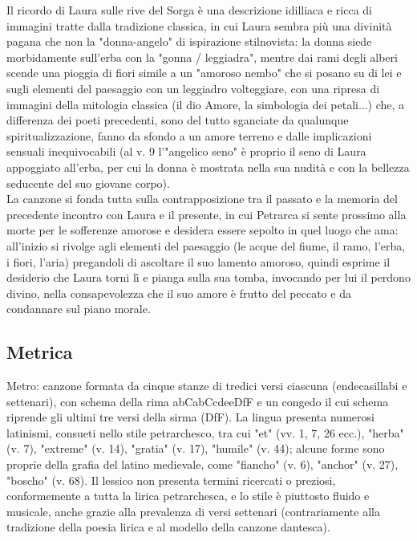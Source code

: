 \documentclass[10pt,a4paper]{article}
\begin{document}
Il ricordo di Laura sulle rive del Sorga è una descrizione idilliaca e ricca di immagini tratte dalla tradizione classica, in cui Laura sembra più una divinità pagana che non la "donna-angelo" di ispirazione stilnovista: la donna siede morbidamente sull'erba con la "gonna / leggiadra", mentre dai rami degli alberi scende una pioggia di fiori simile a un "amoroso nembo" che si posano su di lei e sugli elementi del paesaggio con un leggiadro volteggiare, con una ripresa di immagini della mitologia classica (il dio Amore, la simbologia dei petali...) che, a differenza dei poeti precedenti, sono del tutto sganciate da qualunque spiritualizzazione, fanno da sfondo a un amore terreno e dalle implicazioni sensuali inequivocabili (al v. 9 l'"angelico seno" è proprio il seno di Laura appoggiato all'erba, per cui la donna è mostrata nella sua nudità e con la bellezza seducente del suo giovane corpo).\\

La canzone si fonda tutta sulla contrapposizione tra il passato e la memoria del precedente incontro con Laura e il presente, in cui Petrarca si sente prossimo alla morte per le sofferenze amorose e desidera essere sepolto in quel luogo che ama: all'inizio si rivolge agli elementi del paesaggio (le acque del fiume, il ramo, l'erba, i fiori, l'aria) pregandoli di ascoltare il suo lamento amoroso, quindi esprime il desiderio che Laura torni lì e pianga sulla sua tomba, invocando per lui il perdono divino, nella consapevolezza che il suo amore è frutto del peccato e da condannare sul piano morale.

\subsection{Metrica}

Metro: canzone formata da cinque stanze di tredici versi ciascuna (endecasillabi e settenari), con schema della rima abCabCcdeeDfF e un congedo il cui schema riprende gli ultimi tre versi della sirma (DfF). La lingua presenta numerosi latinismi, consueti nello stile petrarchesco, tra cui "et" (vv. 1, 7, 26 ecc.), "herba" (v. 7), "extreme" (v. 14), "gratia" (v. 17), "humile" (v. 44); alcune forme sono proprie della grafia del latino medievale, come "fiancho" (v. 6), "anchor" (v. 27), "boscho" (v. 68). Il lessico non presenta termini ricercati o preziosi, conformemente a tutta la lirica petrarchesca, e lo stile è piuttosto fluido e musicale, anche grazie alla prevalenza di versi settenari (contrariamente alla tradizione della poesia lirica e al modello della canzone dantesca).
\end{document}
